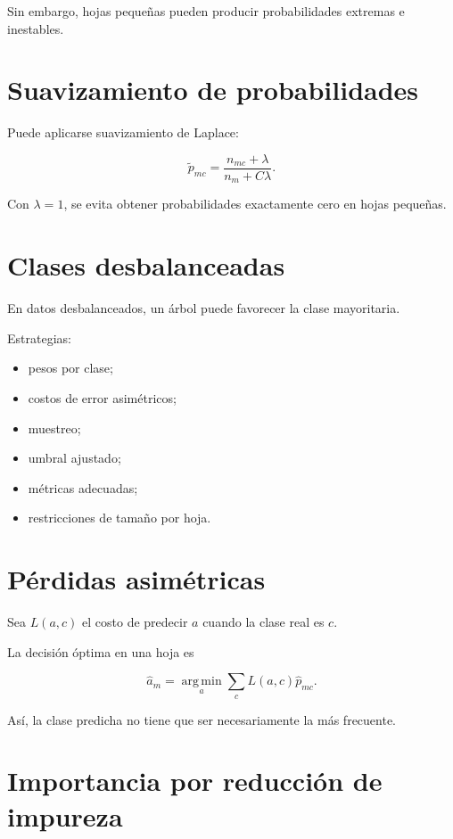 \documentclass[
  spanish,
  11pt,
  letterpaper,
  DIV=11,
  numbers=noendperiod]{scrreprt}
\providecommand{\tightlist}{%
  \setlength{\itemsep}{0pt}\setlength{\parskip}{0pt}}
\theoremstyle{definition}
\theoremstyle{plain}
\theoremstyle{definition}
\theoremstyle{remark}
\begin{document}
Sin embargo, hojas pequeñas pueden producir probabilidades extremas e
inestables.

\section{Suavizamiento de
probabilidades}\label{suavizamiento-de-probabilidades}

Puede aplicarse suavizamiento de Laplace:

\[
\widetilde{p}_{mc}
=
\frac{n_{mc}+\lambda}
{n_m+C\lambda}.
\]

Con \(\lambda=1\), se evita obtener probabilidades exactamente cero en
hojas pequeñas.

\section{Clases desbalanceadas}\label{clases-desbalanceadas-1}

En datos desbalanceados, un árbol puede favorecer la clase mayoritaria.

Estrategias:

\begin{itemize}
\tightlist
\item
  pesos por clase;
\item
  costos de error asimétricos;
\item
  muestreo;
\item
  umbral ajustado;
\item
  métricas adecuadas;
\item
  restricciones de tamaño por hoja.
\end{itemize}

\section{Pérdidas asimétricas}\label{puxe9rdidas-asimuxe9tricas-1}

Sea \(L(a,c)\) el costo de predecir \(a\) cuando la clase real es \(c\).

La decisión óptima en una hoja es

\[
\widehat{a}_m
=
\operatorname*{arg\,min}_a
\sum_c
L(a,c)\widehat{p}_{mc}.
\]

Así, la clase predicha no tiene que ser necesariamente la más frecuente.

\section{Importancia por reducción de
impureza}\label{importancia-por-reducciuxf3n-de-impureza}
\end{document}
